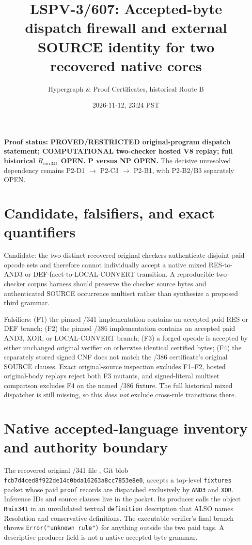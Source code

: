\documentclass[11pt]{article}
\title{LSPV-3/607: Accepted-byte dispatch firewall and external SOURCE identity for two recovered native cores}
\author{Hypergraph \& Proof Certificates, historical Route B}
\date{2026-11-12, 23:24 PST}
\begin{document}
\maketitle
\noindent\textbf{Proof status: PROVED/RESTRICTED original-program dispatch statement; COMPUTATIONAL two-checker hosted V8 replay; full historical $R_{\mathrm{mix341}}$ OPEN. P versus NP OPEN.}
The decisive unresolved dependency remains P2-D1 $\to$ P2-C3 $\to$ P2-B1, with P2-B2/B3 separately OPEN.

\section*{Candidate, falsifiers, and exact quantifiers}
Candidate: the two distinct recovered original checkers authenticate disjoint paid-opcode sets and therefore cannot individually accept a native mixed RES-to-AND3 or DEF-facet-to-LOCAL-CONVERT transition. A reproducible two-checker corpus harness should preserve the checker source bytes and authenticated SOURCE occurrence multiset rather than synthesize a proposed third grammar.

Falsifiers: (F1) the pinned /341 implementation contains an accepted paid RES or DEF branch; (F2) the pinned /386 implementation contains an accepted paid AND3, XOR, or LOCAL-CONVERT branch; (F3) a forged opcode is accepted by either unchanged original verifier on otherwise identical certified bytes; (F4) the separately stored signed CNF does not match the /386 certificate's original SOURCE clauses. Exact original-source inspection excludes F1--F2, hosted original-body replays reject both F3 mutants, and signed-literal multiset comparison excludes F4 on the named /386 fixture. The full historical mixed dispatcher is still missing, so this \emph{does not} exclude cross-rule transitions there.

\section*{Native accepted-language inventory and authority boundary}
The recovered original /341 file , Git blob \texttt{fcb7d4ced8f922de14c0bda16263a8cc7853e8e0}, accepts a top-level \texttt{fixtures} packet whose paid \texttt{proof} records are dispatched exclusively by \texttt{AND3} and \texttt{XOR}. Inference IDs and source clauses live in the packet. Its producer  calls the object \texttt{Rmix341} in an unvalidated textual \texttt{definition} description that ALSO names Resolution and conservative definitions. The executable verifier's final branch throws \texttt{Error("unknown rule")} for anything outside the two paid tags. A descriptive producer field is not a native accepted-byte grammar.
\end{document}
